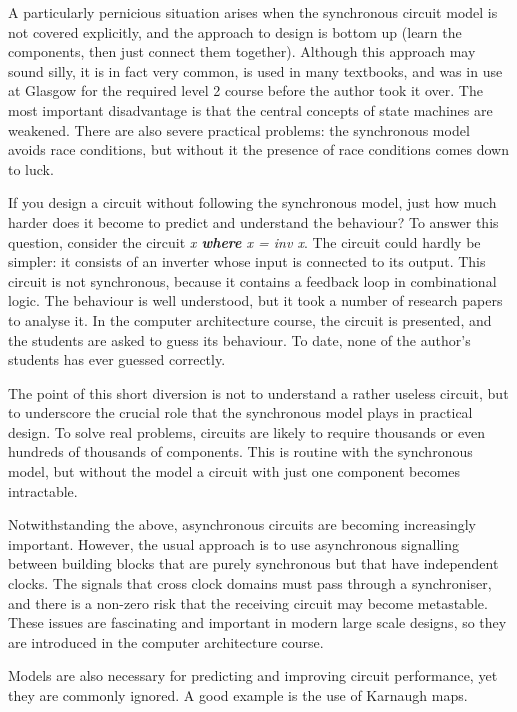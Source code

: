 \documentclass[submission,copyright,creativecommons]{eptcs}
\begin{document}
A particularly pernicious situation arises when the synchronous
circuit model is not covered explicitly, and the approach to design is
bottom up (learn the components, then just connect them together).
Although this approach may sound silly, it is in fact very common, is
used in many textbooks, and was in use at Glasgow for the required
level 2 course before the author took it over.  The most important
disadvantage is that the central concepts of state machines are
weakened.  There are also severe practical problems: the synchronous
model avoids race conditions, but without it the presence of race
conditions comes down to luck.

If you design a circuit without following the synchronous model, just
how much harder does it become to predict and understand the
behaviour?  To answer this question, consider the circuit \textit{ x
  \textbf{where} x = inv x}.  The circuit could hardly be simpler: it
consists of an inverter whose input is connected to its output.  This
circuit is not synchronous, because it contains a feedback loop in
combinational logic.  The behaviour is well understood, but it took a
number of research papers to analyse it.  In the computer architecture
course, the circuit is presented, and the students are asked to guess
its behaviour.  To date, none of the author's students has ever
guessed correctly.

The point of this short diversion is not to understand a rather
useless circuit, but to underscore the crucial role that the
synchronous model plays in practical design.  To solve real problems,
circuits are likely to require thousands or even hundreds of thousands
of components.  This is routine with the synchronous model, but
without the model a circuit with just one component becomes
intractable.

Notwithstanding the above, asynchronous circuits are becoming
increasingly important.  However, the usual approach is to use
asynchronous signalling between building blocks that are purely
synchronous but that have independent clocks.  The signals that cross
clock domains must pass through a synchroniser, and there is a
non-zero risk that the receiving circuit may become metastable.  These
issues are fascinating and important in modern large scale designs, so
they are introduced in the computer architecture course.

Models are also necessary for predicting and improving circuit
performance, yet they are commonly ignored.  A good example is the use
of Karnaugh maps.
\end{document}
